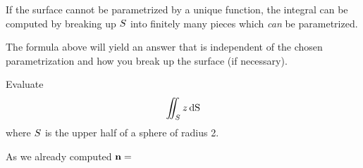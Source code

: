  \begin{remark}
    If the surface cannot be parametrized by a unique function, the integral can be computed by breaking up $S$ into finitely many pieces which \emph{can} be parametrized.

    The formula above will yield an answer that is independent of the chosen parametrization and how you break up the surface (if necessary).
  \end{remark}
%
%
%

\begin{exa}
Evaluate
\[\diint_\superficie z \d \S \] where $S$ is the upper half of a sphere of radius 2.
\end{exa}

\begin{solu}
 As we already computed $\mathbf{ n}=$
\end{solu}




